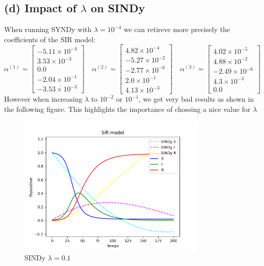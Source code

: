 \documentclass{article}
\begin{document}
\subsection*{(d) Impact of $\lambda$ on SINDy}
When running SYNDy with $\lambda = 10^{-4}$ we can retireve more
precisely the coefficients of the SIR model:
\[
\alpha^{(1)} = \begin{bmatrix}
-5.11 \times 10^{-4} \\
3.53 \times 10^{-3} \\
0.0  \\
-2.04 \times 10^{-1} \\
-3.53 \times 10^{-3}
\end{bmatrix}
\quad
\alpha^{(2)} = \begin{bmatrix}
4.82 \times 10^{-4} \\
-5.27 \times 10^{-2} \\
-2.77 \times 10^{-6} \\
2.0 \times 10^{-1} \\
4.13 \times 10^{-3}
\end{bmatrix}
\quad
\alpha^{(3)} = \begin{bmatrix}
4.02 \times 10^{-5} \\
4.88 \times 10^{-2} \\
-2.49 \times 10^{-6} \\
4.3 \times 10^{-3} \\
0.0
\end{bmatrix}
\]
However when increasing $\lambda$ to $10^{-2}$ or $10^{-1}$, we get very bad results as shown in the following
figure. This highlights the importance of chossing a nice value for $\lambda$
\begin{figure}[h]
\centering 
\includegraphics[width=0.8\textwidth]{images/SIR_lambd_1e-1.png}
\caption{SINDy $\lambda=0.1$}
\label{fig:SIR_bad}
\end{figure}
\end{document}
